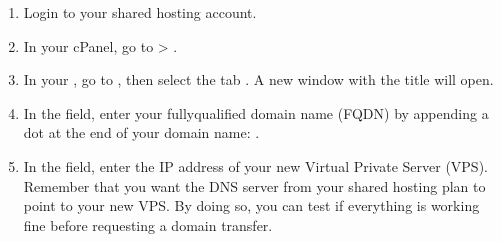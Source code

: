 \documentclass[letterpaper,10pt,english]{sphinxmanual}
\begin{document}
\begin{enumerate}
%
\item {} 
\sphinxAtStartPar
Login to your shared hosting account.

\item {} 
\sphinxAtStartPar
In your cPanel, go to  > .
\begin{quote}

\begin{figure}[htbp]
\centering

\noindent{}
\end{figure}
\end{quote}

\item {} 
\sphinxAtStartPar
In your , go to , then select the tab . A new window with the title  will open.
\begin{quote}

\begin{figure}[htbp]
\centering

\noindent{}
\end{figure}
\end{quote}

\item {} 
\sphinxAtStartPar
In the  field, enter your fully\sphinxhyphen{}qualified domain name (FQDN) by appending a dot at the end of your domain name: .
\begin{quote}

\begin{figure}[htbp]
\centering

\noindent{}
\end{figure}

\newpage
\end{quote}

\item {} 
\sphinxAtStartPar
In the  field, enter the IP address of your new Virtual Private Server (VPS). Remember that you want the DNS server from your shared hosting plan to point to your new VPS. By doing so, you can test if everything is working fine before requesting a domain transfer.
\begin{quote}

\begin{figure}[htbp]
\centering

\noindent{}
\end{figure}
\end{quote}

\end{enumerate}
\end{document}
